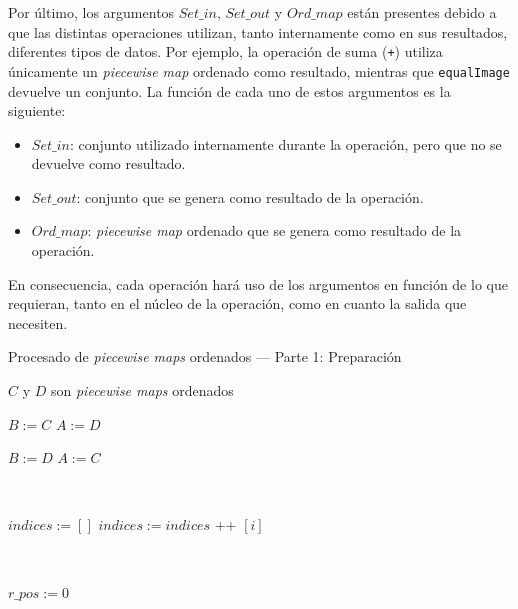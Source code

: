 Por último, los argumentos $Set\_in$, $Set\_out$ y $Ord\_map$ están presentes debido a que las distintas operaciones utilizan, tanto internamente como en sus resultados, diferentes tipos de datos. Por ejemplo, la operación de suma (\texttt{+}) utiliza únicamente un \textit{piecewise map} ordenado como resultado, mientras que \texttt{equalImage} devuelve un conjunto. La función de cada uno de estos argumentos es la siguiente:
\begin{itemize}
    \item $Set\_in$: conjunto utilizado internamente durante la operación, pero que no se devuelve como resultado.
    \item $Set\_out$: conjunto que se genera como resultado de la operación.
    \item $Ord\_map$: \textit{piecewise map} ordenado que se genera como resultado de la operación.
\end{itemize}

En consecuencia, cada operación hará uso de los argumentos en función de lo que requieran, tanto en el núcleo de la operación, como en cuanto la salida que necesiten.


\begin{algorithm}
\caption{Procesado de \textit{piecewise maps} ordenados — Parte 1: Preparación}
\label{alg:processOrdMaps1}
\begin{algorithmic}[1]
\Require $C$ y $D$ son \textit{piecewise maps} ordenados

    \State $B := C$
    \State $A := D$

         \State $B := D$
         \State $A := C$
    \EndIf
          
    \
    
    \State $indices := []$ 
        \State $indices := indices$  \!+\!+  $[i]$
    \EndFor
        
    \
    
    \State $r\_pos := 0$
\EndFunction
\end{algorithmic}
\end{algorithm}

